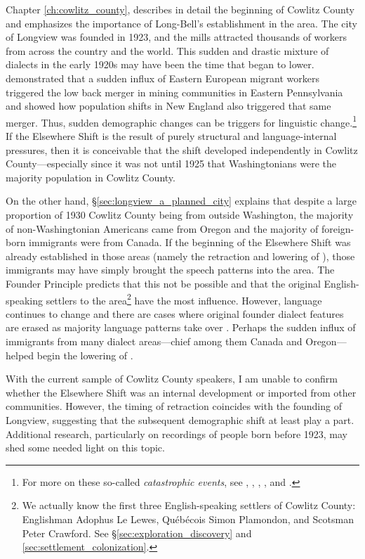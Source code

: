 Chapter \ref{ch:cowlitz_county}, describes in detail the beginning of Cowlitz County and emphasizes the importance of Long-Bell's establishment in the area. The city of Longview was founded in 1923, and the mills attracted thousands of workers from across the country and the world. This sudden and drastic mixture of dialects in the early 1920s may have been the time that \bat began to lower. \citet{herold_1990_diss} demonstrated that a sudden influx of Eastern European migrant workers triggered the low back merger in mining communities in Eastern Pennsylvania and \citet{johnson_2010_pads} showed how population shifts in New England also triggered that same merger. Thus, sudden demographic changes can be triggers for linguistic change.\footnote{For more on these so-called \textit{catastrophic events}, see \citet{bailey_etal_1996}, \citet{bailey_2018}, \citet{schilling_2017}, \citet{carmichael_2017}, and \citet[24]{labov_1994}.} If the Elsewhere Shift is the result of purely structural and language-internal pressures, then it is conceivable that the shift developed independently in Cowlitz County---especially since it was not until 1925 that Washingtonians were the majority population in Cowlitz County.

On the other hand, \S\ref{sec:longview_a_planned_city} explains that despite a large proportion of 1930 Cowlitz County being from outside Washington, the majority of non-Washingtonian Americans came from Oregon and the majority of foreign-born immigrants were from Canada. If the beginning of the Elsewhere Shift was already established in those areas (namely the retraction and lowering of \bat), those immigrants may have simply brought the speech patterns into the area. The Founder Principle \citep{zelinsky_1973, mufwene_1996} predicts that this not be possible and that the original English-speaking settlers to the area\footnote{We actually know the first three English-speaking settlers of Cowlitz County: Englishman Adophus Le Lewes, Qu{\'e}b{\'e}cois Simon Plamondon, and Scotsman Peter Crawford. See \S\ref{sec:exploration_discovery} and \ref{sec:settlement_colonization}.} have the most influence. However, language continues to change and there are cases where original founder dialect features are erased as majority language patterns take over \citep{stanford_etal_2012}. Perhaps the sudden influx of immigrants from many dialect areas---chief among them Canada and Oregon---helped begin the lowering of \trap.

With the current sample of Cowlitz County speakers, I am unable to confirm whether the Elsewhere Shift was an internal development or imported from other communities. However, the timing of \bat retraction coincides with the founding of Longview, suggesting that the subsequent demographic shift at least play a part. Additional research, particularly on recordings of people born before 1923, may shed some needed light on this topic.






